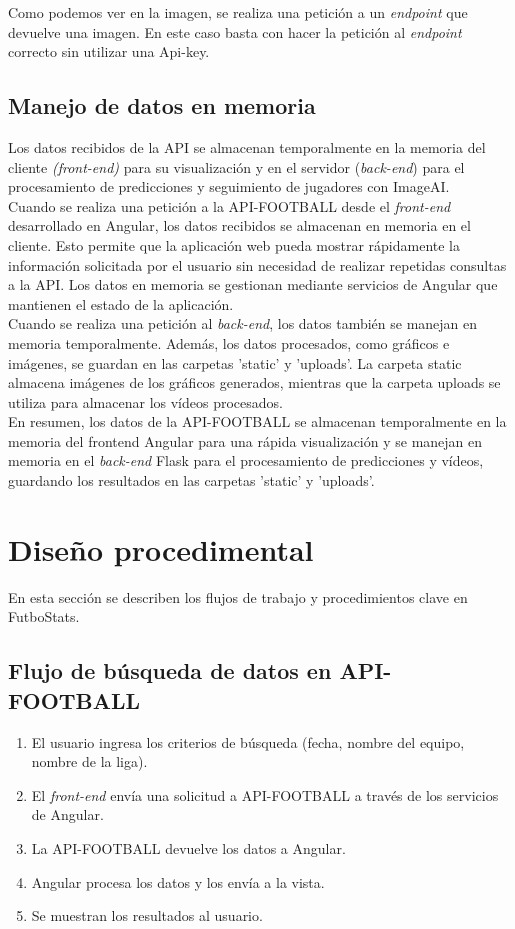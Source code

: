 Como podemos ver en la imagen, se realiza una petición a un \textit{endpoint} que devuelve una imagen. En este caso basta con hacer la petición al \textit{endpoint} correcto sin utilizar una Api-key.

\subsection{Manejo de datos en memoria}
Los datos recibidos de la API se almacenan temporalmente en la memoria del cliente \textit{(front-end)} para su visualización y en el servidor (\textit{back-end}) para el procesamiento de predicciones y seguimiento de jugadores con ImageAI. \\
Cuando se realiza una petición a la API-FOOTBALL desde el \textit{front-end} desarrollado en Angular, los datos recibidos se almacenan en memoria en el cliente. Esto permite que la aplicación web pueda mostrar rápidamente la información solicitada por el usuario sin necesidad de realizar repetidas consultas a la API. Los datos en memoria se gestionan mediante servicios de Angular que mantienen el estado de la aplicación. \\
Cuando se realiza una petición al \textit{back-end}, los datos también se manejan en memoria temporalmente. Además, los datos procesados, como gráficos e imágenes, se guardan en las carpetas 'static' y 'uploads'. La carpeta static almacena imágenes de los gráficos generados, mientras que la carpeta uploads se utiliza para almacenar los vídeos procesados. \\
En resumen, los datos de la API-FOOTBALL se almacenan temporalmente en la memoria del frontend Angular para una rápida visualización y se manejan en memoria en el \textit{back-end} Flask para el procesamiento de predicciones y vídeos, guardando los resultados en las carpetas 'static' y 'uploads'.

\section{Diseño procedimental}
En esta sección se describen los flujos de trabajo y procedimientos clave en FutboStats.

\subsection{Flujo de búsqueda de datos en API-FOOTBALL}
\begin{enumerate}
	\item El usuario ingresa los criterios de búsqueda (fecha, nombre del equipo, nombre de la liga).
	\item El \textit{front-end} envía una solicitud a API-FOOTBALL a través de los servicios de Angular.
        \item La API-FOOTBALL devuelve los datos a Angular.
        \item Angular procesa los datos y los envía a la vista.
        \item Se muestran los resultados al usuario.
\end{enumerate}

